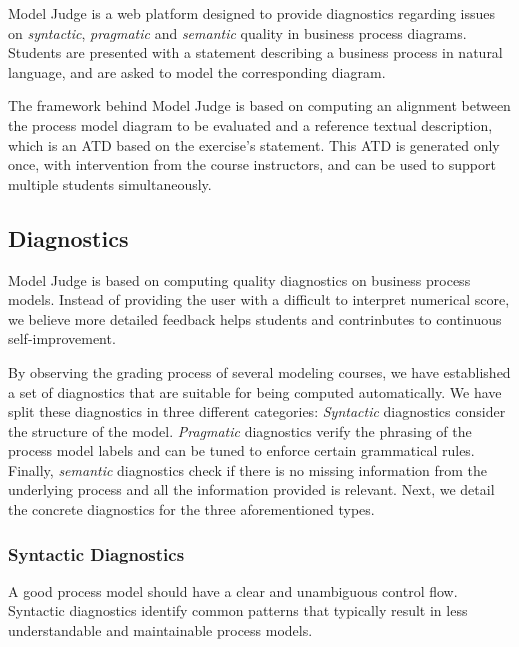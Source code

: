 Model Judge is a web platform designed to provide diagnostics regarding
issues on \emph{syntactic}, \emph{pragmatic} and \emph{semantic} quality in
business process diagrams. Students are presented with a statement describing a
business process in natural language, and are asked to model the corresponding
diagram.

The framework behind Model Judge is based on computing an alignment
between the process model diagram to be evaluated and a reference textual
description, which is an ATD based on the exercise's statement. This ATD is
generated only once, with intervention from the course instructors, and can be
used to support multiple students simultaneously.


\subsection{Diagnostics}

Model Judge is based on computing quality diagnostics on business process
models. Instead of providing the user with a difficult to interpret numerical
score, we believe more detailed feedback helps students and contrinbutes to
continuous self-improvement.

By observing the grading process of several modeling courses, we have
established a set of diagnostics that are suitable for being computed
automatically. We have split these diagnostics in three different categories:
\emph{Syntactic} diagnostics consider the structure of the model.
\emph{Pragmatic} diagnostics verify the phrasing of the process model labels and
can be tuned to enforce certain grammatical rules. Finally, \emph{semantic}
diagnostics check if there is no missing information from the underlying process
and all the information provided is relevant. Next, we detail the concrete
diagnostics for the three aforementioned types.

\subsubsection{Syntactic Diagnostics}

A good process model should have a clear and unambiguous control flow.
Syntactic diagnostics identify common patterns that typically result in
less understandable and maintainable process models.

